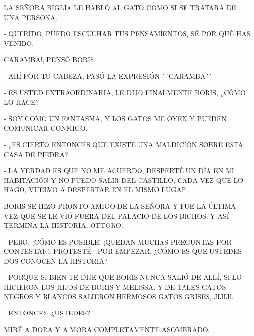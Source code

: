\newpage
{}

LA SEÑORA BIGLIA LE HABLÓ AL GATO COMO SI SE TRATARA DE UNA PERSONA.

- QUERIDO, PUEDO ESCUCHAR TUS PENSAMIENTOS, SÉ POR QUÉ HAS VENIDO.

CARAMBA!, PENSÓ BORIS.

- AHÍ POR TU CABEZA, PASÓ LA EXPRESIÓN ´´CARAMBA´´

- ES USTED EXTRAORDINARIA, LE DIJO FINALMENTE BORIS, ¿CÓMO LO HACE?

- SOY COMO UN FANTASMA, Y LOS GATOS ME OYEN Y PUEDEN COMUNICAR CONMIGO. 

- ¿ES CIERTO ENTONCES QUE EXISTE UNA MALDICIÓN SOBRE ESTA CASA DE PIEDRA?
\newpage
{}
- LA VERDAD ES QUE NO ME ACUERDO, DESPERTÉ UN DÍA EN MI HABITACIÓN Y NO PUEDO SALIR DEL CASTILLO, CADA VEZ QUE LO HAGO, VUELVO A DESPERTAR EN EL MISMO LUGAR.

BORIS SE HIZO PRONTO AMIGO DE LA SEÑORA Y FUE LA ÚLTIMA VEZ QUE SE LE VIÓ FUERA DEL PALACIO DE LOS BICHOS. Y ASÍ TERMINA LA HISTORIA, OTTOKO.

- PERO, ¡CÓMO ES POSIBLE! ¡QUEDAN MUCHAS PREGUNTAS POR CONTESTAR!, PROTESTÉ. -POR EMPEZAR, ¿CÓMO ES QUE USTEDES DOS CONOCEN LA HISTORIA?

- PORQUE SI BIEN TE DIJE QUE BORIS NUNCA SALIÓ DE ALLÍ, SI LO HICIERON LOS HIJOS DE BORIS Y MELISSA. Y DE TALES GATOS NEGROS Y BLANCOS SALIERON HERMOSOS GATOS GRISES, JIJIJI.

- ENTONCES, ¿USTEDES?

MIRÉ A DORA Y A MORA COMPLETAMENTE ASOMBRADO.

